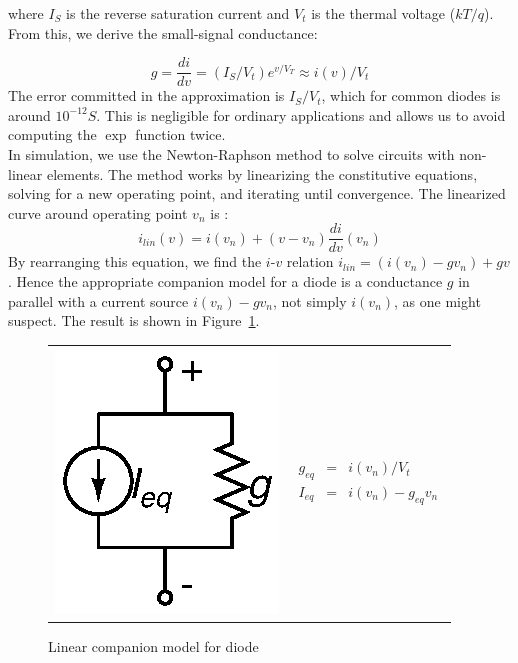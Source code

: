\documentclass{article}
\begin{document}
where $I_S$ is the reverse saturation current and $V_t$ is the thermal voltage ($kT/q$). From this, we derive the small-signal conductance:

\begin{equation}
g = \frac{di}{dv} = (I_S/V_t) e^{v/V_T} \approx i(v)/V_t
\end{equation}
The error committed in the approximation is $I_S / V_t$, which for common diodes is around $10^{-12} S$. This is negligible for ordinary applications and allows us to avoid computing the $\exp$ function twice.\\
In simulation, we use the Newton-Raphson method to solve circuits with non-linear elements. The method works by linearizing the constitutive equations, solving for a new operating point, and iterating until convergence. The linearized curve around operating point $v_n$ is :
\begin{equation}
i_{lin}(v) = i(v_n) + (v - v_n) \frac{di}{dv}(v_n)
\end{equation}
By rearranging this equation, we find the $i$-$v$ relation $i_{lin}=(i(v_n)-gv_n)+gv$. Hence the appropriate companion model for a diode is a conductance $g$ in parallel with a current source $i(v_n)-gv_n$, not simply $i(v_n)$, as one might suspect. The result is shown in Figure~\ref{fig:diode}.


\begin{figure}[h]
\begin{center}
\begin{tabular}{m{3cm}<{\centering}m{3cm}<{\centering}}
	\includegraphics{fig/diode.eps} & 
	\begin{eqnarray*}
		g_{eq}&=&i(v_n)/V_t \\
		I_{eq}&=&i(v_n)-g_{eq}v_n
	\end{eqnarray*}
\end{tabular}
\caption{Linear companion model for diode \label{fig:diode}}
\end{center}
\end{figure}
\end{document}
